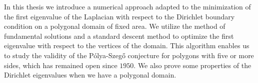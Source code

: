 \begin{my_abstract}
\noindent In this thesis we introduce a numerical approach adapted to the minimization of the first eigenvalue of the Laplacian with respect to the Dirichlet boundary condition on a polygonal domain of fixed area.
We utilize the method of fundamental solutions and a standard descent method to optimize the first eigenvalue with respect to the vertices of the domain.
This algorithm enables us to study the validity of the Pólya-Szegő conjecture for polygons with five or more sides, which has remained open since $1950$.
We also prove some properties of the Dirichlet eigenvalues when we have a polygonal domain.
\end{my_abstract}
